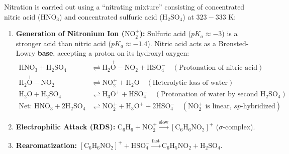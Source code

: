 \documentclass[10pt,a4paper]{article}
\begin{document}
\begin{conceptbox}
Nitration is carried out using a ``nitrating mixture'' consisting of concentrated nitric acid ($\mathrm{HNO_3}$) and concentrated sulfuric acid ($\mathrm{H_2SO_4}$) at $323-333\text{ K}$:
\begin{enumerate}[leftmargin=*]
  \item \textbf{Generation of Nitronium Ion ($\mathrm{NO_2^+}$):} Sulfuric acid ($pK_a \approx -3$) is a stronger acid than nitric acid ($pK_a \approx -1.4$). Nitric acid acts as a Br{\o}nsted-Lowry \textbf{base}, accepting a proton on its hydroxyl oxygen:
  \begin{align}
    \mathrm{HNO_3} + \mathrm{H_2SO_4} &\rightleftharpoons \mathrm{H_2\overset{+}{O}-NO_2} + \mathrm{HSO_4^-} \quad (\text{Protonation of nitric acid})\\
    \mathrm{H_2\overset{+}{O}-NO_2} &\rightleftharpoons \mathrm{NO_2^+} + \mathrm{H_2O} \quad (\text{Heterolytic loss of water})\\
    \mathrm{H_2O} + \mathrm{H_2SO_4} &\rightleftharpoons \mathrm{H_3O^+} + \mathrm{HSO_4^-} \quad (\text{Protonation of water by second } \mathrm{H_2SO_4})\\
    \text{Net: } \mathrm{HNO_3} + 2\mathrm{H_2SO_4} &\rightleftharpoons \mathrm{NO_2^+} + \mathrm{H_3O^+} + 2\mathrm{HSO_4^-} \quad (\mathrm{NO_2^+} \text{ is linear, } sp\text{-hybridized})
  \end{align}
  \item \textbf{Electrophilic Attack (RDS):} $\mathrm{C_6H_6} + \mathrm{NO_2^+} \xrightarrow{\text{slow}} [\mathrm{C_6H_6NO_2}]^+$ ($\sigma$-complex).
  \item \textbf{Rearomatization:} $[\mathrm{C_6H_6NO_2}]^+ + \mathrm{HSO_4^-} \xrightarrow{\text{fast}} \mathrm{C_6H_5NO_2} + \mathrm{H_2SO_4}$.
\end{enumerate}
\end{conceptbox}
\end{document}
